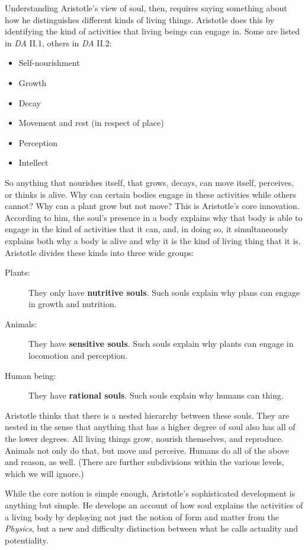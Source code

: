 \documentclass[11pt]{article}
\begin{document}
Understanding Aristotle's view of soul, then, requires saying something about how he distinguishes different kinds of living things. Aristotle does this by identifying the kind of activities that living beings can engage in. Some are listed in \emph{DA} II.1, others in \emph{DA} II.2:
\begin{itemize}
\item Self-nourishment
\item Growth
\item Decay
\item Movement and rest (in respect of place)
\item Perception
\item Intellect
\end{itemize}
So anything that nourishes itself, that grows, decays, can move itself, perceives, or thinks is alive. Why can certain bodies engage in these activities while others cannot? Why can a plant grow but not move? This is Aristotle's core innovation. According to him, the soul's presence in a body explains why that body is able to engage in the kind of activities that it can, and, in doing so, it simultaneously explains both why a body is alive and why it is the kind of living thing that it is. Aristotle divides these kinds into three wide groups: 

\newpage

\begin{description}
\item[Plants:] They only have \textbf{nutritive souls}. Such souls explain why plans can engage in growth and nutrition. 
\item[Animals:] They have \textbf{sensitive souls}. Such souls explain why plants can engage in locomotion and perception. 
\item[Human being:] They have \textbf{rational souls}. Such souls explain why humans can thing. 
\end{description}
Aristotle thinks that there is a nested hierarchy between these souls. They are nested in the sense that anything that has a higher degree of soul also has all of the lower degrees. All living things grow, nourish themselves, and reproduce. Animals not only do that, but move and perceive. Humans do all of the above and reason, as well. (There are further subdivisions within the various levels, which we will ignore.) 

While the core notion is simple enough, Aristotle's sophisticated development is anything but simple. He develops an account of how soul explains the activities of a living body by deploying not just the notion of form and matter from the \emph{Physics}, but a new and difficulty distinction between what he calls actuality and potentiality. 
\end{document}
